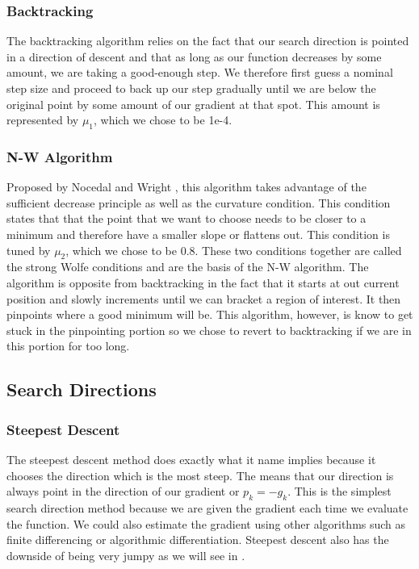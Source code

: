 \documentclass{article}
\begin{document}
\subsubsection*{Backtracking}

The backtracking algorithm relies on the fact that our search direction is pointed in a direction of descent and that as long as our function decreases by some amount, we are taking a good-enough step. We therefore first guess a nominal step size and proceed to back up our step gradually until we are below the original point by some amount of our gradient at that spot. This amount is represented by $\mu_1$, which we chose to be 1e-4.



\subsubsection*{N-W Algorithm}

Proposed by Nocedal and Wright \cite{nocedal2006numerical}, this algorithm takes advantage of the sufficient decrease principle as well as the curvature condition. This condition states that that the point that we want to choose needs to be closer to a minimum and therefore have a smaller slope or flattens out. This condition is tuned by $\mu_2$, which we chose to be 0.8. These two conditions together are called the strong Wolfe conditions and are the basis of the N-W algorithm. The algorithm is opposite from backtracking in the fact that it starts at out current position and slowly increments until we can bracket a region of interest. It then pinpoints where a good minimum will be. This algorithm, however, is know to get stuck in the pinpointing portion so we chose to revert to backtracking if we are in this portion for too long.


\subsection*{Search Directions}



\subsubsection*{Steepest Descent}
The steepest descent method does exactly what it name implies because it chooses the direction which is the most steep. The means that our direction is always point in the direction of our gradient or $p_k = -g_k$. This is the simplest search direction method because we are given the gradient each time we evaluate the function. We could also estimate the gradient using other algorithms such as finite differencing or algorithmic differentiation. Steepest descent also has the downside of being very jumpy as we will see in .
\end{document}
